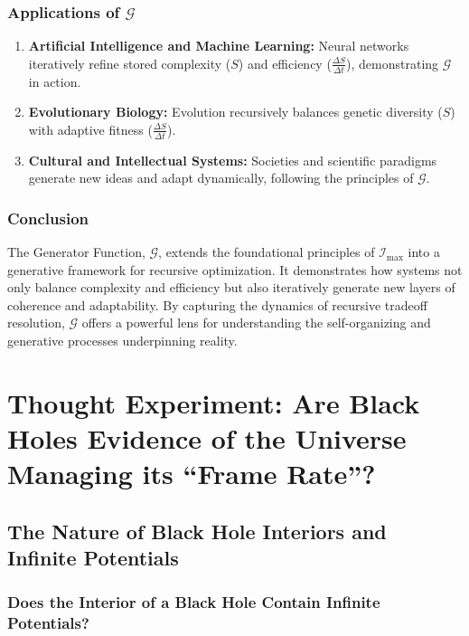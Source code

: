 \documentclass[12pt]{article}
\begin{document}
\subsubsection{Applications of \(\mathcal{G}\)}
\begin{enumerate}
    \item \textbf{Artificial Intelligence and Machine Learning:}
    Neural networks iteratively refine stored complexity (\(S\)) and efficiency (\(\frac{\Delta S}{\Delta t}\)), demonstrating \(\mathcal{G}\) in action.
    \item \textbf{Evolutionary Biology:}
    Evolution recursively balances genetic diversity (\(S\)) with adaptive fitness (\(\frac{\Delta S}{\Delta t}\)).
    \item \textbf{Cultural and Intellectual Systems:}
    Societies and scientific paradigms generate new ideas and adapt dynamically, following the principles of \(\mathcal{G}\).
\end{enumerate}

\subsubsection{Conclusion}
The Generator Function, \(\mathcal{G}\), extends the foundational principles of \(\mathcal{I}_{\text{max}}\) into a generative framework for recursive optimization. It demonstrates how systems not only balance complexity and efficiency but also iteratively generate new layers of coherence and adaptability. By capturing the dynamics of recursive tradeoff resolution, \(\mathcal{G}\) offers a powerful lens for understanding the self-organizing and generative processes underpinning reality.


\section{Thought Experiment: Are Black Holes Evidence of the Universe Managing its ``Frame Rate''?}

\subsection{The Nature of Black Hole Interiors and Infinite Potentials}

\subsubsection{Does the Interior of a Black Hole Contain Infinite Potentials?}
\end{document}
